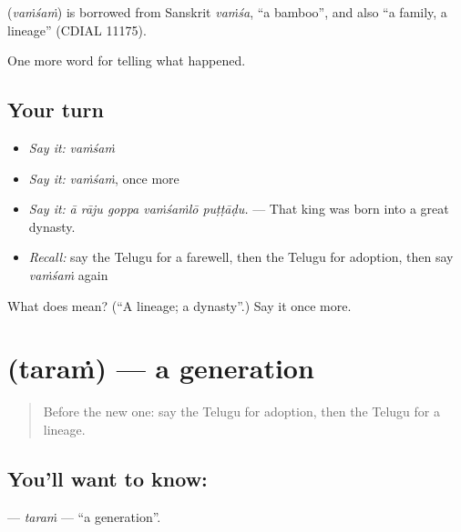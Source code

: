 \begin{cousinweb}
\textbf{} (\emph{vaṁśaṁ}) is borrowed from Sanskrit \emph{vaṁśa}, \textquotedblleft{}a bamboo\textquotedblright{}, and also \textquotedblleft{}a family, a lineage\textquotedblright{} (CDIAL 11175).
\end{cousinweb}

\begin{grammarlens}[title={What you've built}]
One more word for telling what happened.
\end{grammarlens}

\subsection*{Your turn}
\begin{itemize}
\raggedright
  \item \emph{Say it:} \emph{vaṁśaṁ}
  \item \emph{Say it:} \emph{vaṁśaṁ}, once more
  \item \emph{Say it:} \emph{ā rāju goppa vaṁśaṁlō puṭṭāḍu.} — That king was born into a great dynasty.
  \item \emph{Recall:} say the Telugu for a farewell, then the Telugu for adoption, then say \emph{vaṁśaṁ} again
\end{itemize}

\begin{tcolorbox}[breakable,colback=teal!4,colframe=teal!35!black,title={Before you move on}]
What does  mean? (\textquotedblleft{}A lineage; a dynasty\textquotedblright{}.) Say it once more.
\end{tcolorbox}
\section[\texorpdfstring{\te{తరం} (taraṁ)}{తరం (taraṁ)}]{ (taraṁ) — a generation}

\label{lesson:TE-C357-taram}



\begin{quote}
Before the new one: say the Telugu for adoption, then the Telugu for a lineage.
\end{quote}

\subsection*{You'll want to know: }
\textbf{} — \emph{taraṁ} — \textquotedblleft{}a generation\textquotedblright{}.

